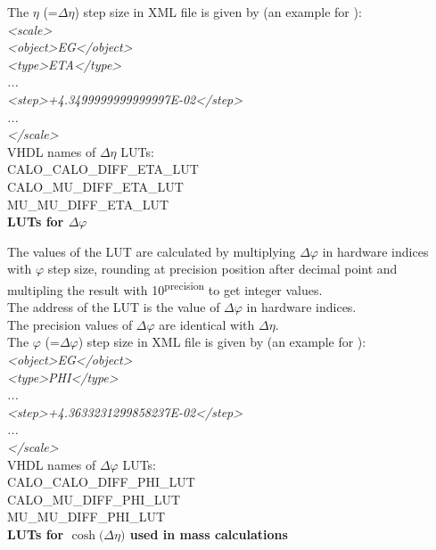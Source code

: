 The $\eta$ (=$\Delta\eta$) step size in XML file is given by (an example for \egamma):\\
\textit{<scale>\\
<object>EG</object>\\
    <type>ETA</type>\\
    ...\\
    <step>+4.3499999999999997E-02</step>\\
...\\
</scale>}\\

VHDL names of $\Delta\eta$ LUTs:\\
CALO\_CALO\_DIFF\_ETA\_LUT\\
CALO\_MU\_DIFF\_ETA\_LUT\\
MU\_MU\_DIFF\_ETA\_LUT\\

\textbf{LUTs for $\Delta\varphi$}
\label{sec:gtl:calc_luts_delta_phi}

The values of the LUT are calculated by multiplying $\Delta\varphi$ in hardware indices with $\varphi$ step size, rounding at precision position after decimal point and multipling the result with 10\textsuperscript{\tiny{precision}} to get integer values.\\
The address of the LUT is the value of $\Delta\varphi$ in hardware indices.\\

The precision values of $\Delta\varphi$ are identical with $\Delta\eta$.\\

The $\varphi$ (=$\Delta\varphi$) step size in XML file is given by (an example for \egamma):\\
\textit{<object>EG</object>\\
    <type>PHI</type>\\
    ...\\
    <step>+4.3633231299858237E-02</step>\\
...\\
</scale>}\\

VHDL names of $\Delta\varphi$ LUTs:\\
CALO\_CALO\_DIFF\_PHI\_LUT\\
CALO\_MU\_DIFF\_PHI\_LUT\\
MU\_MU\_DIFF\_PHI\_LUT\\

\textbf{LUTs for $\cosh($$\Delta\eta$$)$ used in mass calculations}
\label{sec:gtl:calc_luts_cosh_delta_eta}

